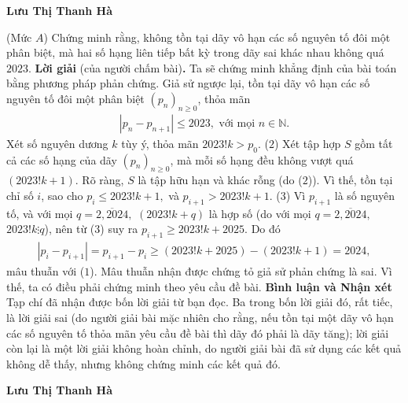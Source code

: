 \begin{multicols}{2}
	\begin{flushright}
		\textbf{\color{thachthuctoanhoc}Lưu Thị Thanh Hà}
	\end{flushright}
	{\color{thachthuctoanhoc}{\usefont{T5}{qag}{b}{n} P688.}}
	(Mức $A$) Chứng minh rằng, không tồn tại dãy vô hạn các số nguyên tố đôi một phân biệt, mà hai số hạng liên tiếp bất kỳ trong dãy sai khác nhau không quá $2023$. 
	\vskip 0.05cm
	\textbf{\color{thachthuctoanhoc}Lời giải} (của người chấm bài)\textbf{\color{thachthuctoanhoc}.}
	\vskip 0.05cm
	Ta sẽ chứng minh khẳng định của bài toán bằng phương pháp phản chứng.
	\vskip 0.05cm
	Giả sử ngược lại, tồn tại dãy vô hạn các số nguyên tố đôi một phân biệt ${\left( {{p_n}} \right)_{n \ge 0}}$, thỏa mãn
	\begin{align*}
		\left| {{p_n} - {p_{n + 1}}} \right| \le 2023, \text{ với mọi } n \in \mathbb{N}. \tag{$1$}
	\end{align*}
	Xét số nguyên dương $k$ tùy ý, thỏa mãn $2023!k > {p_0}.$ \hfill ($2$)
	\vskip 0.05cm
	Xét tập hợp $S$ gồm tất cả các số hạng của dãy ${\left( {{p_n}} \right)_{n \ge 0}}$, mà mỗi số hạng đều không vượt quá $(2023!k + 1)$.
	\vskip 0.05cm
	Rõ ràng, $S$ là tập hữu hạn và khác rỗng (do ($2$)). Vì thế, tồn tại chỉ số $i$, sao cho  ${p_i} \le 2023!k + 1,$ và ${p_{i + 1}} > 2023!k + 1.$ \hfill ($3$)
	\vskip 0.05cm
	Vì  ${p_{i + 1}}$ là số nguyên tố, và với mọi $q = \overline {2,2024} ,$  $(2023!k + q)$ là hợp số (do với mọi $q = \overline {2,2024} ,$  $2023!k \vdots q$), nên từ ($3$) suy ra ${p_{i + 1}} \ge 2023!k + 2025.$  Do đó
	\begin{align*}
		\left| {{p_i} - {p_{i + 1}}} \right| = {p_{i + 1}} - {p_i} \ge \left( {2023!k + 2025} \right) - \left( {2023!k + 1} \right) = 2024,
	\end{align*}
	mâu thuẫn với ($1$).
	\vskip 0.05cm
	Mâu thuẫn nhận được chứng tỏ giả sử phản chứng là sai. Vì thế, ta có điều phải chứng minh theo yêu cầu đề bài.
	\vskip 0.05cm
	\textbf{\color{thachthuctoanhoc}Bình luận và Nhận xét}
	\vskip 0.05cm
	Tạp chí đã nhận được bốn lời giải từ bạn đọc. Ba trong bốn lời giải đó, rất tiếc, là lời giải sai (do người giải bài mặc nhiên cho rằng, nếu tồn tại một dãy vô hạn các số nguyên tố thỏa mãn yêu cầu đề bài thì dãy đó phải là dãy tăng); lời giải còn lại là một lời giải không hoàn chỉnh, do người giải bài đã sử dụng các kết quả không dễ thấy, nhưng không chứng minh các kết quả đó.
	\begin{flushright}
		\textbf{\color{thachthuctoanhoc}Lưu Thị Thanh Hà}
	\end{flushright}
	{}

\end{multicols}
